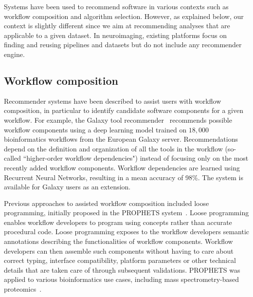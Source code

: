 \documentclass[conference]{IEEEtran}
\begin{document}
Systems have been used to recommend software in various contexts such as workflow composition and algorithm selection. However, as explained below, our context is slightly different since we aim at recommending analyses that are applicable to a given dataset. In neuroimaging, existing platforms focus on finding and reusing pipelines and datasets but do not include any recommender engine.
    
\subsection{Workflow composition}

Recommender systems have been described to assist users with workflow composition, in particular to identify candidate software components for a given workflow. For example, the Galaxy tool recommender~\cite{kumar2021tool} recommends possible workflow components using a deep learning model trained on $18,000$ bioinformatics workflows from the European Galaxy server. Recommendations depend on the definition and organization of all the tools in the workflow (so-called ``higher-order workflow dependencies") instead of focusing only on the most recently added workflow components. Workflow dependencies are learned using Recurrent Neural Networks, resulting in a mean accuracy of 98\%. The system is available for Galaxy users as an extension. 

Previous approaches to assisted workflow composition included loose programming, initially proposed in the PROPHETS system~\cite{lamprecht2010synthesis,naujokat2012loose,lamprecht2013user}. Loose programming enables workflow developers to program using concepts rather than accurate procedural code. Loose programming exposes to the workflow developers semantic annotations describing the functionalities of workflow components. Workflow developers can then assemble such components without having to care about correct typing, interface compatibility, platform parameters or other technical details that are taken care of through subsequent validations. PROPHETS was applied to various bioinformatics use cases, including mass spectrometry-based proteomics~\cite{palmblad2019automated}.

\end{document}
